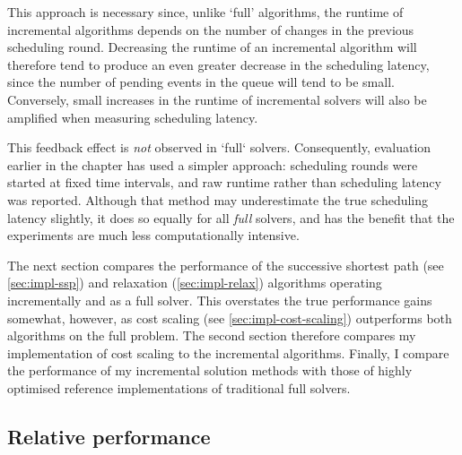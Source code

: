 
This approach is necessary since, unlike `full' algorithms, the runtime of incremental algorithms depends on the number of changes in the previous scheduling round. Decreasing the runtime of an incremental algorithm will therefore tend to produce an even greater decrease in the scheduling latency, since the number of pending events in the queue will tend to be small. Conversely, small increases in the runtime of incremental solvers will also be amplified when measuring scheduling latency. 

This feedback effect is \emph{not} observed in `full` solvers. Consequently, evaluation earlier in the chapter has used a simpler approach: scheduling rounds were started at fixed time intervals, and raw runtime rather than scheduling latency was reported. Although that method may underestimate the true scheduling latency slightly\footnotemark, it does so equally for all \emph{full} solvers, and has the benefit that the experiments are much less computationally intensive.

The next section compares the performance of the successive shortest path (see \cref{sec:impl-ssp}) and relaxation (\cref{sec:impl-relax}) algorithms operating incrementally and as a full solver. This overstates the true performance gains somewhat, however, as cost scaling (see \cref{sec:impl-cost-scaling}) outperforms both algorithms on the full problem. The second section therefore compares my implementation of cost scaling to the incremental algorithms. Finally, I compare the performance of my incremental solution methods with those of highly optimised reference implementations of traditional full solvers.

\subsection{Relative performance}


